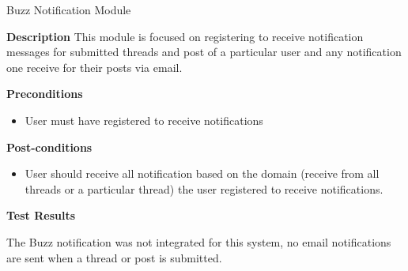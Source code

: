 \item Buzz Notification Module

\textbf{Description}
This module is focused on registering to receive notification messages for submitted threads and post of a particular user and any notification one receive for their posts via email.
 	
\textbf{Preconditions}
\begin{itemize}
	\item User must have registered to receive notifications 
\end{itemize}

\textbf{Post-conditions}
\begin{itemize}
\item User should receive all notification based on the domain (receive from all threads or a particular thread) the user registered to receive notifications.   
\end{itemize}

\textbf{Test Results}

The Buzz notification was not integrated for this system, no email notifications are sent when a thread or post is submitted. 